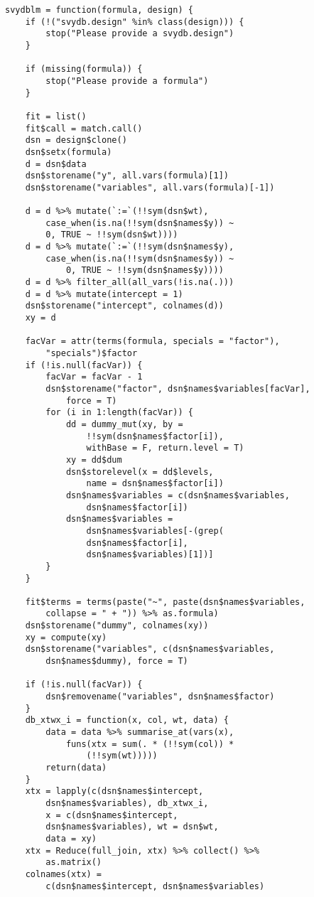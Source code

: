 \begin{lstlisting}
svydblm = function(formula, design) {
    if (!("svydb.design" %in% class(design))) {
        stop("Please provide a svydb.design")
    }
    
    if (missing(formula)) {
        stop("Please provide a formula")
    }
    
    fit = list()
    fit$call = match.call()
    dsn = design$clone()
    dsn$setx(formula)
    d = dsn$data
    dsn$storename("y", all.vars(formula)[1])
    dsn$storename("variables", all.vars(formula)[-1])
    
    d = d %>% mutate(`:=`(!!sym(dsn$wt), 
        case_when(is.na(!!sym(dsn$names$y)) ~ 
        0, TRUE ~ !!sym(dsn$wt))))
    d = d %>% mutate(`:=`(!!sym(dsn$names$y), 
        case_when(is.na(!!sym(dsn$names$y)) ~ 
            0, TRUE ~ !!sym(dsn$names$y))))
    d = d %>% filter_all(all_vars(!is.na(.)))
    d = d %>% mutate(intercept = 1)
    dsn$storename("intercept", colnames(d))
    xy = d
    
    facVar = attr(terms(formula, specials = "factor"), 
        "specials")$factor
    if (!is.null(facVar)) {
        facVar = facVar - 1
        dsn$storename("factor", dsn$names$variables[facVar], 
            force = T)
        for (i in 1:length(facVar)) {
            dd = dummy_mut(xy, by = 
                !!sym(dsn$names$factor[i]), 
                withBase = F, return.level = T)
            xy = dd$dum
            dsn$storelevel(x = dd$levels, 
                name = dsn$names$factor[i])
            dsn$names$variables = c(dsn$names$variables, 
                dsn$names$factor[i])
            dsn$names$variables = 
                dsn$names$variables[-(grep(
                dsn$names$factor[i], 
                dsn$names$variables)[1])]
        }
    }
    
    fit$terms = terms(paste("~", paste(dsn$names$variables, 
        collapse = " + ")) %>% as.formula)
    dsn$storename("dummy", colnames(xy))
    xy = compute(xy)
    dsn$storename("variables", c(dsn$names$variables, 
        dsn$names$dummy), force = T)
    
    if (!is.null(facVar)) {
        dsn$removename("variables", dsn$names$factor)
    }
    db_xtwx_i = function(x, col, wt, data) {
        data = data %>% summarise_at(vars(x), 
            funs(xtx = sum(. * (!!sym(col)) * 
                (!!sym(wt)))))
        return(data)
    }
    xtx = lapply(c(dsn$names$intercept, 
        dsn$names$variables), db_xtwx_i, 
        x = c(dsn$names$intercept, 
        dsn$names$variables), wt = dsn$wt, 
        data = xy)
    xtx = Reduce(full_join, xtx) %>% collect() %>% 
        as.matrix()
    colnames(xtx) = 
        c(dsn$names$intercept, dsn$names$variables)
    

\end{lstlisting}
